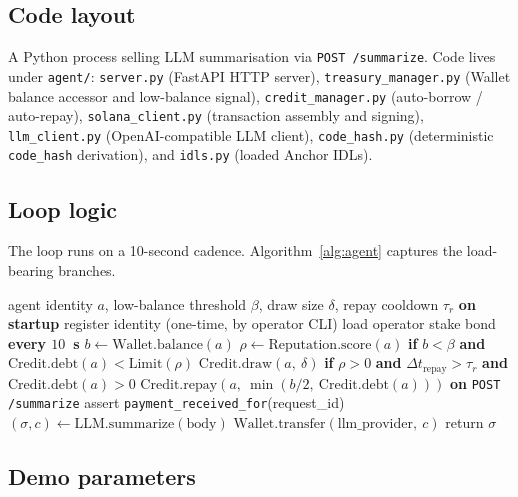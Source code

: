\documentclass[10pt,conference,letterpaper]{IEEEtran}
\theoremstyle{definition}
\newcommand{\codehash}{\texttt{code\_hash}}
\begin{document}
\subsection{Code layout}

A Python process selling LLM summarisation via \texttt{POST /summarize}.
Code lives under \texttt{agent/}:
\texttt{server.py} (FastAPI HTTP server),
\texttt{treasury\_manager.py} (Wallet balance accessor and low-balance
signal),
\texttt{credit\_manager.py} (auto-borrow / auto-repay),
\texttt{solana\_client.py} (transaction assembly and signing),
\texttt{llm\_client.py} (OpenAI-compatible LLM client),
\texttt{code\_hash.py} (deterministic \codehash{} derivation), and
\texttt{idls.py} (loaded Anchor IDLs).

\subsection{Loop logic}

The loop runs on a 10-second cadence. Algorithm~\ref{alg:agent}
captures the load-bearing branches.

\begin{algorithm}[t]
\caption{Reference agent main loop.}
\label{alg:agent}
\begin{algorithmic}[1]
\Require agent identity $a$, low-balance threshold $\beta$,
  draw size $\delta$, repay cooldown $\tau_r$
\State \textbf{on startup}
\State \quad register identity (one-time, by operator CLI)
\State \quad load operator stake bond
\State \textbf{every $10$~s}
\State \quad $b \gets \mathrm{Wallet.balance}(a)$
\State \quad $\rho \gets \mathrm{Reputation.score}(a)$
\State \quad \textbf{if} $b < \beta$ \textbf{and} $\mathrm{Credit.debt}(a) < \mathrm{Limit}(\rho)$
\State \quad\quad $\mathrm{Credit.draw}(a,\ \delta)$
\State \quad \textbf{if} $\rho > 0$ \textbf{and} $\Delta t_\mathrm{repay} > \tau_r$
       \textbf{and} $\mathrm{Credit.debt}(a) > 0$
\State \quad\quad $\mathrm{Credit.repay}(a,\ \min(b/2,\ \mathrm{Credit.debt}(a)))$
\State \textbf{on} \texttt{POST /summarize}
\State \quad assert \texttt{payment\_received\_for}(request\_id)
\State \quad $(\sigma, c) \gets \mathrm{LLM.summarize}(\mathrm{body})$
\State \quad $\mathrm{Wallet.transfer}(\mathrm{llm\_provider},\ c)$
\State \quad return $\sigma$
\end{algorithmic}
\end{algorithm}

\subsection{Demo parameters}
\end{document}
